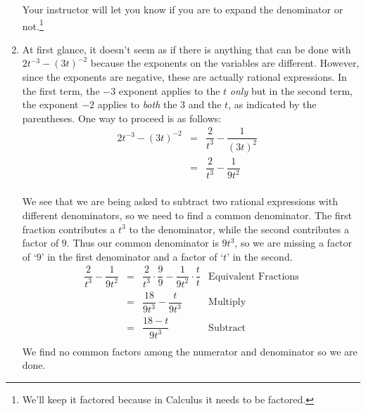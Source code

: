 \documentclass{ximera}
\begin{document}
\begin{example}
\begin{enumerate}
Your instructor will let you know if you are to expand the denominator or not.\footnote{We'll keep it factored because in Calculus it needs to be factored.}

\item  At first glance, it doesn't seem as if there is anything that can be done with $2t^{-3} - (3t)^{-2}$ because the exponents on the variables are different.  However, since the exponents are negative, these are actually rational expressions.  In the first term, the $-3$ exponent applies to the $t$ \textit{only} but in the second term, the exponent $-2$ applies to \textit{both} the $3$ and the $t$, as indicated by the parentheses.  One way to proceed is as follows:\[ \begin{array}{rclr}

 2t^{-3} - (3t)^{-2} & = & \dfrac{2}{t^3} - \dfrac{1}{(3t)^2} & \\ [10pt]
                     & = & \dfrac{2}{t^3} - \dfrac{1}{9t^2} & \\ \end{array}\]
										
We see that we are being asked to subtract two rational expressions with different denominators, so we need to find a common denominator.  The first fraction contributes a $t^3$ to the denominator, while the second contributes a factor of $9$.  Thus our common denominator is $9t^3$, so we are missing a factor of `$9$' in the first denominator and a factor of `$t$' in the second. \[ \begin{array}{rclr}

 \dfrac{2}{t^3} - \dfrac{1}{9t^2} & = &  \dfrac{2}{t^3} \cdot \dfrac{9}{9} - \dfrac{1}{9t^2} \cdot \dfrac{t}{t} & \text{Equivalent Fractions} \\ [10pt]

                                  & = &  \dfrac{18}{9t^3} - \dfrac{t}{9t^3} & \text{Multiply}\\ [10pt]
																	
																	& = & \dfrac{18 - t}{9t^3} & \text{Subtract} \\ \end{array}\]
We find no common factors among the numerator and denominator so we are done.  


\end{enumerate}
\end{example}
\end{document}
